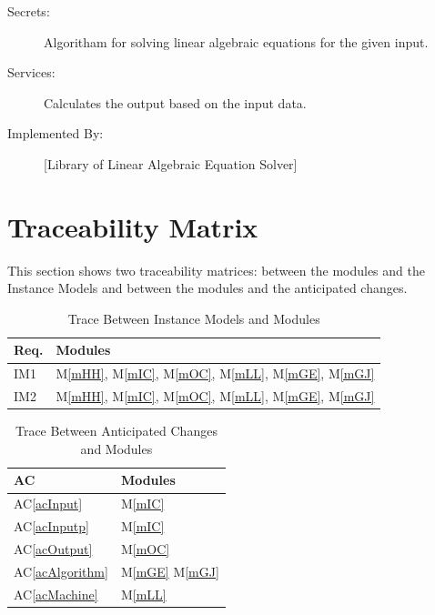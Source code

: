 \documentclass[12pt, titlepage]{article}
\newcommand{\acref}[1]{AC\ref{#1}}
\newcommand{\mref}[1]{M\ref{#1}}
\begin{document}
\begin{description}
\item[Secrets:]Algoritham for solving linear algebraic equations for the given input.
\item[Services:]Calculates the output based on the input data.
\item[Implemented By:] [Library of Linear Algebraic Equation Solver]
\end{description}




\section{Traceability Matrix} \label{SecTM}

This section shows two traceability matrices: between the modules and the
Instance Models and between the modules and the anticipated changes.

\begin{table}[H]
\centering
\begin{tabular}{p{} p{}}
\toprule
\textbf{Req.} & \textbf{Modules}\\
\midrule


IM1 & \mref{mHH}, \mref{mIC}, \mref{mOC}, \mref{mLL}, \mref{mGE}, \mref{mGJ}\\
IM2 & \mref{mHH}, \mref{mIC}, \mref{mOC}, \mref{mLL}, \mref{mGE}, \mref{mGJ}\\

\bottomrule
\end{tabular}
\caption{Trace Between Instance Models and Modules}
\label{TblRT}
\end{table}

\begin{table}[H]
\centering
\begin{tabular}{p{} p{}}
\toprule
\textbf{AC} & \textbf{Modules}\\
\midrule
\acref{acInput} & \mref{mIC}\\
\acref{acInputp} & \mref{mIC}\\
\acref{acOutput} & \mref{mOC}\\
\acref{acAlgorithm} & \mref{mGE} \mref{mGJ}\\
\acref{acMachine} & \mref{mLL}\\

\bottomrule
\end{tabular}
\caption{Trace Between Anticipated Changes and Modules}
\label{TblACT}
\end{table}
\end{document}
